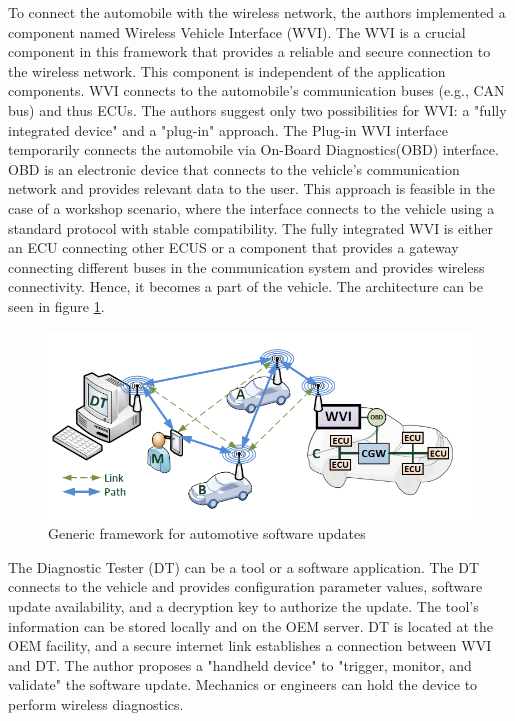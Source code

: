 \documentclass[12pt,a4paper]{article}
\begin{document}
To connect the automobile with the wireless network, the authors implemented a component named Wireless Vehicle Interface (WVI). The WVI is a crucial component in this framework that provides a reliable and secure connection to the wireless network. This component is independent of the application components. WVI connects to the automobile's communication buses (e.g., CAN bus) and thus ECUs. The authors suggest only two possibilities for WVI: a "fully integrated device" and a "plug-in" approach. The Plug-in WVI interface temporarily connects the automobile via On-Board Diagnostics(OBD) interface. OBD is an electronic device that connects to the vehicle's communication network and provides relevant data to the user. This approach is feasible in the case of a workshop scenario, where the interface connects to the vehicle using a standard protocol with stable compatibility. The fully integrated WVI is either an ECU connecting other ECUS or a component that provides a gateway connecting different buses in the communication system and provides wireless connectivity. Hence, it becomes a part of the vehicle. The architecture can be seen in figure \ref{generic_sw_steiger}. \cite{r3} \\

\begin{figure}[H]
\centering
\includegraphics[scale=0.8]{generic_sw_steiger.PNG}
\caption{Generic framework for automotive software updates \cite{r3}}
\label{generic_sw_steiger}
\end{figure}

The Diagnostic Tester (DT) can be a tool or a software application. The DT connects to the vehicle and provides configuration parameter values, software update availability, and a decryption key to authorize the update. The tool's information can be stored locally and on the OEM server. DT is located at the OEM facility, and a secure internet link establishes a connection between WVI and DT. The author proposes a "handheld device" to "trigger, monitor, and validate" the software update. Mechanics or engineers can hold the device to perform wireless diagnostics. \cite{r3} \\
\end{document}
